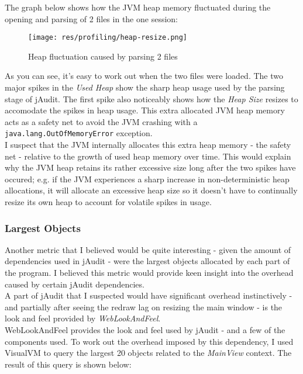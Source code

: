 \documentclass[9pt]{article}
\begin{document}
			The graph below shows how the JVM heap memory fluctuated during the
			opening and parsing of 2 files in the one session:\\

			\begin{figure}[H]
				\centering
				\texttt{[image: res/profiling/heap-resize.png]}
				\caption{Heap fluctuation caused by parsing 2 files}
			\end{figure}

			As you can see, it's easy to work out when the two files were
			loaded. The two major spikes in the \textit{Used Heap} show the
			sharp heap usage used by the parsing stage of jAudit. The first
			spike also noticeably shows how the \textit{Heap Size} resizes to
			accomodate the spikes in heap usage. This extra allocated JVM heap
			memory acts as a safety net to avoid the JVM crashing with a
			\texttt{java.lang.OutOfMemoryError} exception.\\
			
			I suspect that the JVM internally allocates this extra heap memory -
			the safety net - relative to the growth of used heap memory over
			time. This would explain why the JVM heap retains its rather
			excessive size long after the two spikes have occured; e.g. if the
			JVM experiences a sharp increase in non-deterministic heap
			allocations, it will allocate an excessive heap size so it doesn't
			have to continually resize its own heap to account for volatile
			spikes in usage. 

		\subsubsection{Largest Objects}
			
			Another metric that I believed would be quite interesting - given
			the amount of dependencies used in jAudit - were the largest objects
			allocated by each part of the program. I believed this metric would
			provide keen insight into the overhead caused by certain jAudit
			dependencies.\\

			A part of jAudit that I suspected would have significant overhead
			instinctively - and partially after seeing the redraw lag on
			resizing the main window - is the look and feel provided by
			\textit{WebLookAndFeel}.\\

			WebLookAndFeel provides the look and feel used by jAudit - and a few
			of the components used. To work out the overhead imposed by this
			dependency, I used VisualVM to query the largest 20 objects related
			to the \textit{MainView} context. The result of this query is
			shown below:\\
\end{document}
